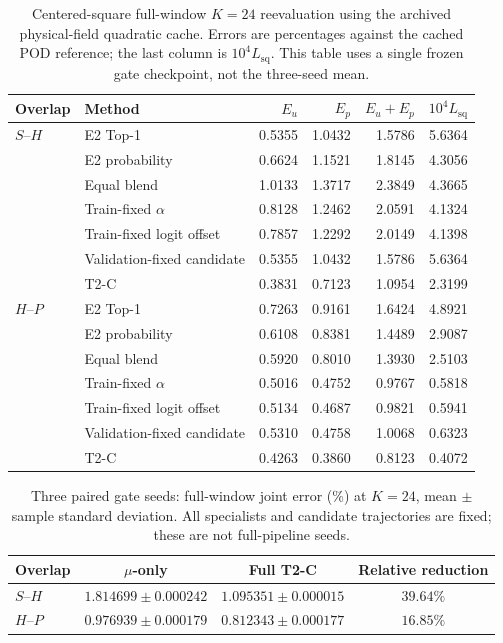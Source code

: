 \documentclass{article}
\begin{document}
\begin{table}[H]
\centering
\caption{Centered-square full-window $K=24$ reevaluation using the
archived physical-field quadratic cache. Errors are percentages against
the cached POD reference; the last column is $10^4 L_{\mathrm{sq}}$.
This table uses a single frozen gate checkpoint, not the three-seed mean.}
\label{tab:t2c_full_window_controls}
\small
\setlength{\tabcolsep}{3.5pt}
\begin{tabular}{@{}llrrrr@{}}
\toprule
Overlap & Method & $E_u$ & $E_p$ & $E_u+E_p$ & $10^4L_{\mathrm{sq}}$\\
\midrule
$S$--$H$ & E2 Top-1 & 0.5355 & 1.0432 & 1.5786 & 5.6364 \\
 & E2 probability & 0.6624 & 1.1521 & 1.8145 & 4.3056 \\
 & Equal blend & 1.0133 & 1.3717 & 2.3849 & 4.3665 \\
 & Train-fixed $\alpha$ & 0.8128 & 1.2462 & 2.0591 & 4.1324 \\
 & Train-fixed logit offset & 0.7857 & 1.2292 & 2.0149 & 4.1398 \\
 & Validation-fixed candidate & 0.5355 & 1.0432 & 1.5786 & 5.6364 \\
 & T2-C & 0.3831 & 0.7123 & 1.0954 & 2.3199 \\
\midrule
$H$--$P$ & E2 Top-1 & 0.7263 & 0.9161 & 1.6424 & 4.8921 \\
 & E2 probability & 0.6108 & 0.8381 & 1.4489 & 2.9087 \\
 & Equal blend & 0.5920 & 0.8010 & 1.3930 & 2.5103 \\
 & Train-fixed $\alpha$ & 0.5016 & 0.4752 & 0.9767 & 0.5818 \\
 & Train-fixed logit offset & 0.5134 & 0.4687 & 0.9821 & 0.5941 \\
 & Validation-fixed candidate & 0.5310 & 0.4758 & 1.0068 & 0.6323 \\
 & T2-C & 0.4263 & 0.3860 & 0.8123 & 0.4072 \\
\bottomrule
\end{tabular}
\end{table}





\begin{table}[H]
\centering
\caption{Three paired gate seeds: full-window joint error (\%) at
$K=24$, mean $\pm$ sample standard deviation. All specialists and
candidate trajectories are fixed; these are not full-pipeline seeds.}
\label{tab:t2c_window_seeds}
\small
\begin{tabular}{@{}lccc@{}}
\toprule
Overlap & $\mu$-only & Full T2-C & Relative reduction\\
\midrule
$S$--$H$ & $1.814699\pm0.000242$ & $1.095351\pm0.000015$ & $39.64\%$\\
$H$--$P$ & $0.976939\pm0.000179$ & $0.812343\pm0.000177$ & $16.85\%$\\
\bottomrule
\end{tabular}
\end{table}
\end{document}
